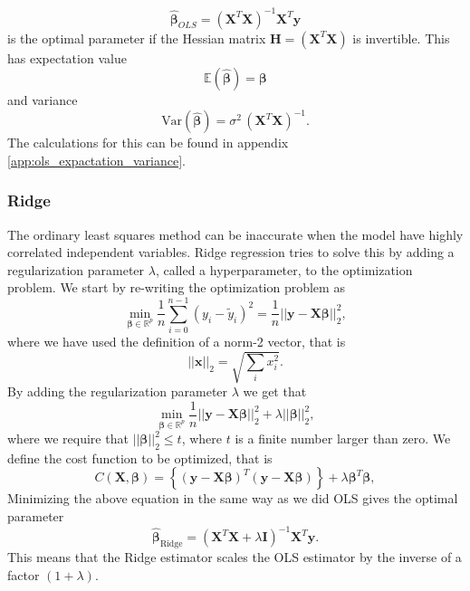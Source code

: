\begin{equation}\label{eq:beta_OLS}
    \hat{\boldsymbol\beta}_{OLS}=(\mathbf{X}^T\mathbf{X})^{-1}\mathbf{X}^T\mathbf{y}
\end{equation}
is the optimal parameter if the Hessian matrix $\mathbf{H}=(\mathbf{X}^T\mathbf{X})$ is invertible. This has expectation value 
\begin{equation}\label{eq:expectation_beta}
\mathbb{E}(\boldsymbol{\hat{\beta}}) =\boldsymbol{\beta}
\end{equation}
and variance
\begin{equation}\label{eq:variance_beta}
\mbox{Var}(\boldsymbol{\hat{\beta}})  = \sigma^2 \, (\mathbf{X}^{T} \mathbf{X})^{-1}.
\end{equation}
The calculations for this can be found in appendix \ref{app:ols_expactation_variance}.


\subsubsection{Ridge}
The ordinary least squares method can be inaccurate when the model have highly correlated independent variables. Ridge regression tries to solve this by adding a regularization parameter $\lambda$, called a hyperparameter, to the optimization problem. We start by re-writing the optimization problem as 
$$
{\displaystyle \min_{\boldsymbol{\beta}\in
{\mathbb{R}}^{p}}}\frac{1}{n}\sum_{i=0}^{n-1}\left(y_i-\tilde{y}_i\right)^2=\frac{1}{n}\vert\vert \boldsymbol{y}-\boldsymbol{X}\boldsymbol{\beta}\vert\vert_2^2,
$$
where we have used the definition of  a norm-2 vector, that is
$$
\vert\vert \boldsymbol{x}\vert\vert_2 = \sqrt{\sum_i x_i^2}.
$$
By adding the regularization parameter $\lambda$ we get that
$$
{\displaystyle \min_{\boldsymbol{\beta}\in
{\mathbb{R}}^{p}}}\frac{1}{n}\vert\vert \boldsymbol{y}-\boldsymbol{X}\boldsymbol{\beta}\vert\vert_2^2+\lambda\vert\vert \boldsymbol{\beta}\vert\vert_2^2,
$$
where we
require that $\vert\vert \boldsymbol{\beta}\vert\vert_2^2\le t$, where $t$ is
a finite number larger than zero. We define the cost function to be optimized, that is
$$
C(\boldsymbol{X},\boldsymbol{\beta})=\left\{(\boldsymbol{y}-\boldsymbol{X}\boldsymbol{\beta})^T(\boldsymbol{y}-\boldsymbol{X}\boldsymbol{\beta})\right\}+\lambda\boldsymbol{\beta}^T\boldsymbol{\beta},
$$
Minimizing the above equation in the same way as we did OLS gives the optimal parameter
\begin{equation}\label{eq:beta_ridge}
\hat{\boldsymbol{\beta}}_{\mathrm{Ridge}} = \left(\boldsymbol{X}^T\boldsymbol{X}+\lambda\boldsymbol{I}\right)^{-1}\boldsymbol{X}^T\boldsymbol{y}.
\end{equation}
This means that the Ridge estimator scales the OLS estimator by the inverse of a factor $(1+\lambda)$.




